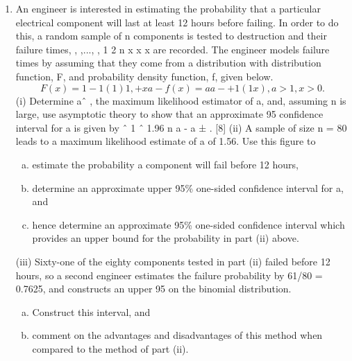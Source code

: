 \documentclass[a4paper,12pt]{article}
\begin{document}
\begin{enumerate}
\newpage
\item  An engineer is interested in estimating the probability that a particular
electrical component will last at least 12 hours before failing. In order to do
this, a random sample of n components is tested to destruction and their
failure times, , ,..., , 1 2 n x x x are recorded. The engineer models failure times by
assuming that they come from a distribution with distribution function, F, and
probability density function, f, given below.
\[F(x) = 1 - 1
(1 ) 1
,
+ x a- f(x) = a
a
-
+
1
(1 x)
, a > 1, x > 0.\]
(i) Determine aˆ , the maximum likelihood estimator of a, and, assuming n
is large, use asymptotic theory to show that an approximate 95%
confidence interval for a is given by
ˆ 1 ˆ 1.96
n
a -
a ± . [8]
(ii) A sample of size n = 80 leads to a maximum likelihood estimate of a of
1.56. Use this figure to
\begin{enumerate}[(a)]
\item estimate the probability a component will fail before 12 hours,
\item determine an approximate upper 95\% one-sided confidence
interval for a, and
\item hence determine an approximate 95\% one-sided confidence
interval which provides an upper bound for the probability in
part (ii) above. 
\end{enumerate}
(iii) Sixty-one of the eighty components tested in part (ii) failed before 12
hours, so a second engineer estimates the failure probability by
61/80 = 0.7625, and constructs an upper 95%
on the binomial distribution.
\begin{enumerate}[(a)]
\item Construct this interval, and
\item comment on the advantages and disadvantages of this method
when compared to the method of part (ii). 
\end{enumerate}



\end{enumerate}
\end{document}
